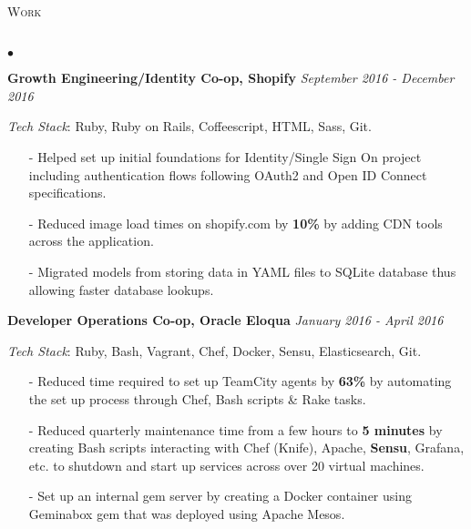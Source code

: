 \documentclass[11pt]{article}
\newcommand{\lineunder}{\vspace*{-8pt} \\ \hspace*{-18pt} \hrulefill \\}
\newcommand{\header}[1]{{\hspace*{-15pt}\vspace*{6pt} \textsc{#1}} \vspace*{-6pt} \lineunder }
\newenvironment{achievements}{\begin{list}{$\bullet$}{\topsep 0pt \itemsep -1.5pt \leftmargin 5pt}}{\vspace*{4pt}\end{list}}
\begin{document}
\header{\fontsize{11.1}{10}\selectfont Work}
\begin{achievements}

\item \textbf{{\fontsize{9.5}{10}\selectfont Growth Engineering/Identity Co-op, Shopify}} \hfill \textit {September 2016 - December 2016}

\vspace{1pt}
\item[ ] \textit{Tech Stack}: Ruby, Ruby on Rails, Coffeescript, HTML, Sass, Git.
\vspace{2pt}

\begin{itemize}
\item[-] Helped set up initial foundations for Identity/Single Sign On project including authentication flows following OAuth2 and Open ID Connect specifications.
\vspace{2pt}
\item[-] Reduced image load times on shopify.com by \textbf{10\%} by adding CDN tools across the application.
\vspace{2pt}
\item[-] Migrated models from storing data in YAML files to SQLite database thus allowing faster database lookups.
\end{itemize}

\vspace{5pt}

\item \textbf{{\fontsize{9.5}{10}\selectfont  Developer Operations Co-op, Oracle Eloqua}} \hfill \textit {January 2016 - April 2016}

\vspace{1pt}
\item[ ] \textit{Tech Stack}: Ruby, Bash, Vagrant, Chef, Docker, Sensu, Elasticsearch, Git.
\vspace{2pt}

\begin{itemize}
\item[-]Reduced time required to set up TeamCity agents by \textbf{63\%} by automating the set up process through Chef, Bash scripts \& Rake tasks.
\vspace{2pt}
\item[-]Reduced quarterly maintenance time from a few hours to \textbf{5 minutes} by creating Bash scripts interacting with Chef (Knife), Apache, \textbf{Sensu}, Grafana, etc. to shutdown and start up services across over 20 virtual machines.
\vspace{2pt}
\item[-]Set up an internal gem server by creating a Docker container using Geminabox gem that was deployed using Apache Mesos.
\end{itemize}


\end{achievements}
\end{document}

